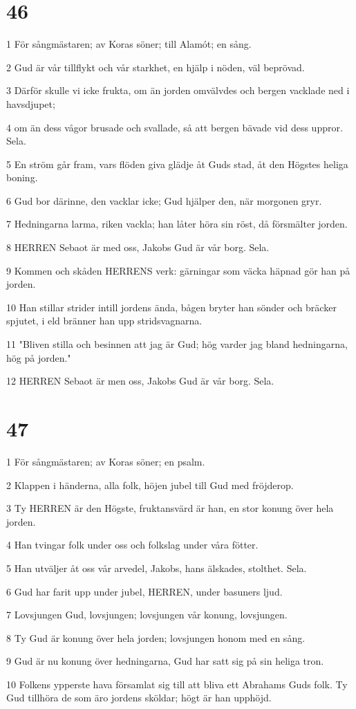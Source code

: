 \chapter{46}

\par 1 För sångmästaren; av Koras söner; till Alamót; en sång.
\par 2 Gud är vår tillflykt och vår starkhet, en hjälp i nöden, väl beprövad.
\par 3 Därför skulle vi icke frukta, om än jorden omvälvdes och bergen vacklade ned i havsdjupet;
\par 4 om än dess vågor brusade och svallade, så att bergen bävade vid dess uppror. Sela.
\par 5 En ström går fram, vars flöden giva glädje åt Guds stad, åt den Högstes heliga boning.
\par 6 Gud bor därinne, den vacklar icke; Gud hjälper den, när morgonen gryr.
\par 7 Hedningarna larma, riken vackla; han låter höra sin röst, då försmälter jorden.
\par 8 HERREN Sebaot är med oss, Jakobs Gud är vår borg. Sela.
\par 9 Kommen och skåden HERRENS verk: gärningar som väcka häpnad gör han på jorden.
\par 10 Han stillar strider intill jordens ända, bågen bryter han sönder och bräcker spjutet, i eld bränner han upp stridsvagnarna.
\par 11 "Bliven stilla och besinnen att jag är Gud; hög varder jag bland hedningarna, hög på jorden."
\par 12 HERREN Sebaot är men oss, Jakobs Gud är vår borg. Sela.

\chapter{47}

\par 1 För sångmästaren; av Koras söner; en psalm.
\par 2 Klappen i händerna, alla folk, höjen jubel till Gud med fröjderop.
\par 3 Ty HERREN är den Högste, fruktansvärd är han, en stor konung över hela jorden.
\par 4 Han tvingar folk under oss och folkslag under våra fötter.
\par 5 Han utväljer åt oss vår arvedel, Jakobs, hans älskades, stolthet. Sela.
\par 6 Gud har farit upp under jubel, HERREN, under basuners ljud.
\par 7 Lovsjungen Gud, lovsjungen; lovsjungen vår konung, lovsjungen.
\par 8 Ty Gud är konung över hela jorden; lovsjungen honom med en sång.
\par 9 Gud är nu konung över hedningarna, Gud har satt sig på sin heliga tron.
\par 10 Folkens ypperste hava församlat sig till att bliva ett Abrahams Guds folk. Ty Gud tillhöra de som äro jordens sköldar; högt är han upphöjd.

